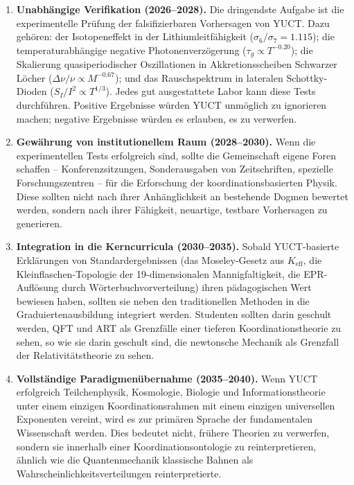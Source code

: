 \documentclass[12pt,a4paper]{article}
\begin{document}
\begin{enumerate}
	\item \textbf{Unabhängige Verifikation (2026–2028).} Die dringendste Aufgabe ist die experimentelle Prüfung der falsifizierbaren Vorhersagen von YUCT. Dazu gehören: der Isotopeneffekt in der Lithiumleitfähigkeit (\(\sigma_6/\sigma_7 = 1.115\)); die temperaturabhängige negative Photonenverzögerung (\(\tau_g \propto T^{-0.20}\)); die Skalierung quasiperiodischer Oszillationen in Akkretionsscheiben Schwarzer Löcher (\(\Delta\nu/\nu \propto M^{-0.67}\)); und das Rauschspektrum in lateralen Schottky-Dioden (\(S_I/I^2 \propto T^{1/3}\)). Jedes gut ausgestattete Labor kann diese Tests durchführen. Positive Ergebnisse würden YUCT unmöglich zu ignorieren machen; negative Ergebnisse würden es erlauben, es zu verwerfen.
	
	\item \textbf{Gewährung von institutionellem Raum (2028–2030).} Wenn die experimentellen Tests erfolgreich sind, sollte die Gemeinschaft eigene Foren schaffen – Konferenzsitzungen, Sonderausgaben von Zeitschriften, spezielle Forschungszentren – für die Erforschung der koordinationsbasierten Physik. Diese sollten nicht nach ihrer Anhänglichkeit an bestehende Dogmen bewertet werden, sondern nach ihrer Fähigkeit, neuartige, testbare Vorhersagen zu generieren.
	
	\item \textbf{Integration in die Kerncurricula (2030–2035).} Sobald YUCT-basierte Erklärungen von Standardergebnissen (das Moseley-Gesetz aus \(K_{\mathrm{eff}}\), die Kleinflaschen-Topologie der 19-dimensionalen Mannigfaltigkeit, die EPR-Auflösung durch Wörterbuchvorverteilung) ihren pädagogischen Wert bewiesen haben, sollten sie neben den traditionellen Methoden in die Graduiertenausbildung integriert werden. Studenten sollten darin geschult werden, QFT und ART als Grenzfälle einer tieferen Koordinationstheorie zu sehen, so wie sie darin geschult sind, die newtonsche Mechanik als Grenzfall der Relativitätstheorie zu sehen.
	
	\item \textbf{Vollständige Paradigmenübernahme (2035–2040).} Wenn YUCT erfolgreich Teilchenphysik, Kosmologie, Biologie und Informationstheorie unter einem einzigen Koordinationsrahmen mit einem einzigen universellen Exponenten vereint, wird es zur primären Sprache der fundamentalen Wissenschaft werden. Dies bedeutet nicht, frühere Theorien zu verwerfen, sondern sie innerhalb einer Koordinationsontologie zu reinterpretieren, ähnlich wie die Quantenmechanik klassische Bahnen als Wahrscheinlichkeitsverteilungen reinterpretierte.
\end{enumerate}
\end{document}
